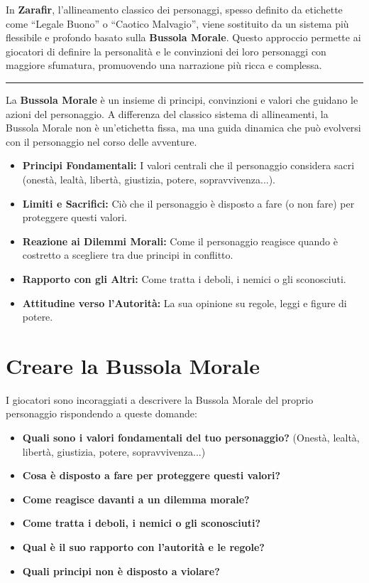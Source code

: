 \documentclass[../manuale_main.tex]{subfiles}
\begin{document}
In \textbf{Zarafir}, l’allineamento classico dei personaggi, spesso definito da etichette come “Legale Buono” o “Caotico Malvagio”, viene sostituito da un sistema più flessibile e profondo basato sulla \textbf{Bussola Morale}. Questo approccio permette ai giocatori di definire la personalità e le convinzioni dei loro personaggi con maggiore sfumatura, promuovendo una narrazione più ricca e complessa.

\vspace{0.5cm}
\noindent
\begin{center}
\rule{\textwidth}{0.4pt} 
\end{center}
\vspace{0.5cm}

La \textbf{Bussola Morale} è un insieme di principi, convinzioni e valori che guidano le azioni del personaggio. A differenza del classico sistema di allineamenti, la Bussola Morale non è un’etichetta fissa, ma una guida dinamica che può evolversi con il personaggio nel corso delle avventure.

\begin{itemize}
    \item \textbf{Principi Fondamentali:} I valori centrali che il personaggio considera sacri (onestà, lealtà, libertà, giustizia, potere, sopravvivenza...).
    \item \textbf{Limiti e Sacrifici:} Ciò che il personaggio è disposto a fare (o non fare) per proteggere questi valori.
    \item \textbf{Reazione ai Dilemmi Morali:} Come il personaggio reagisce quando è costretto a scegliere tra due principi in conflitto.
    \item \textbf{Rapporto con gli Altri:} Come tratta i deboli, i nemici o gli sconosciuti.
    \item \textbf{Attitudine verso l'Autorità:} La sua opinione su regole, leggi e figure di potere.
\end{itemize}

\vspace{0.3cm}

\section{Creare la Bussola Morale}
I giocatori sono incoraggiati a descrivere la Bussola Morale del proprio personaggio rispondendo a queste domande:

\begin{itemize}
    \item \textbf{Quali sono i valori fondamentali del tuo personaggio?} (Onestà, lealtà, libertà, giustizia, potere, sopravvivenza...)
    \item \textbf{Cosa è disposto a fare per proteggere questi valori?}
    \item \textbf{Come reagisce davanti a un dilemma morale?}
    \item \textbf{Come tratta i deboli, i nemici o gli sconosciuti?}
    \item \textbf{Qual è il suo rapporto con l’autorità e le regole?}
    \item \textbf{Quali principi non è disposto a violare?}
\end{itemize}
\end{document}
